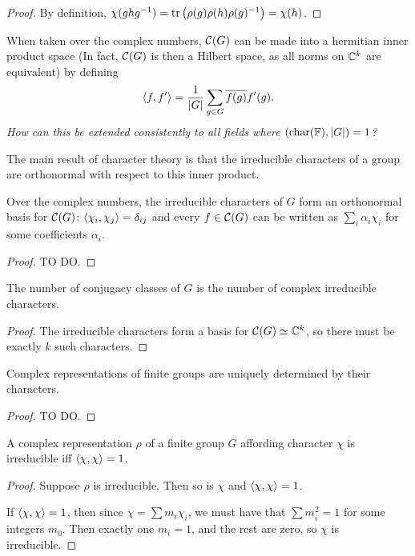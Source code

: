 \documentclass[a4paper]{article}
\begin{document}
\begin{proof}
    By definition, $\chi(ghg^{-1}) = \operatorname{tr}\left(\rho(g)\rho(h)\rho(g)^{-1}\right) = \chi(h)$. 
\end{proof}

When taken over the complex numbers, $\mathcal{C}(G)$ can be made into a hermitian inner product space (In fact, $\mathcal{C}(G)$ is then a Hilbert space, as all norms on $\mathbb{C}^k$ are equivalent) by defining 
$$\left\langle f , f' \right\rangle = \frac{1}{|G|}\sum_{g\in G} \overline{f(g)}f'(g).$$
\textit{How can this be extended consistently to all fields where $(\operatorname{char}(\mathbb{F}), |G|) = 1$?}

The main result of character theory is that the irreducible characters of a group are orthonormal with respect to this inner product.

\begin{thm}
    Over the complex numbers, the irreducible characters of $G$ form an orthonormal basis for $\mathcal{C}(G)$: $\left\langle \chi_i , \chi_j \right\rangle = \delta_{ij}$ and every $f \in \mathcal{C}(G)$ can be written as $\sum_i \alpha_i \chi_i$ for some coefficients $\alpha_i$.
\end{thm}

\begin{proof}
    TO DO.
\end{proof}

\begin{cor}
    The number of conjugacy classes of $G$ is the number of complex irreducible characters.
\end{cor}

\begin{proof}
    The irreducible characters form a basis for $\mathcal{C}(G) \simeq \mathbb{C}^k$, so there must be exactly $k$ such characters.
\end{proof}

\begin{cor}
    Complex representations of finite groups are uniquely determined by their characters.
\end{cor}

\begin{proof}
    TO DO.
\end{proof}

\begin{cor}
    A complex representation $\rho$ of a finite group $G$ affording character $\chi$ is irreducible iff $\left\langle \chi , \chi \right\rangle = 1$.
\end{cor}

\begin{proof}
    Suppose $\rho$ is irreducible. Then so is $\chi$ and $\left\langle \chi , \chi \right\rangle = 1$. 

    If $\left\langle \chi , \chi \right\rangle = 1$, then since $\chi = \sum m_i \chi_i$, we must have that $\sum m_i^2 = 1$ for some integers $m_0$. Then exactly one $m_i=1$, and the rest are zero, so $\chi$ is irreducible.
\end{proof}
\end{document}
